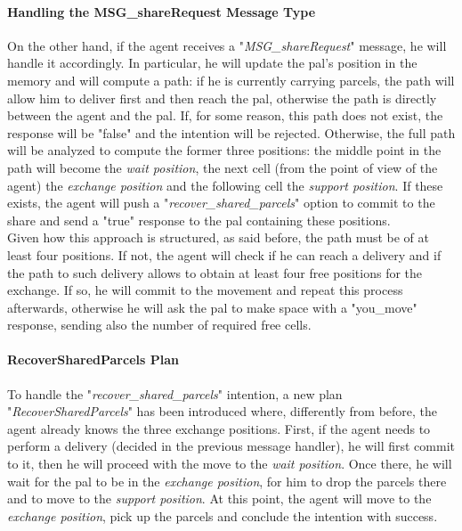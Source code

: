                 \paragraph{Handling the MSG\_shareRequest Message Type}
                    On the other hand, if the agent receives a "\textit{MSG\_shareRequest}" message, he will handle it accordingly. In particular, he will update the pal's position in the memory and will compute a path: if he is currently carrying parcels, the path will allow him to deliver first and then reach the pal, otherwise the path is directly between the agent and the pal. If, for some reason, this path does not exist, the response will be "false" and the intention will be rejected. Otherwise, the full path will be analyzed to compute the former three positions: the middle point in the path will become the \textit{wait position}, the next cell (from the point of view of the agent) the \textit{exchange position} and the following cell the \textit{support position}. If these exists, the agent will push a "\textit{recover\_shared\_parcels}" option to commit to the share and send a "true" response to the pal containing these positions.
                    \medskip\\
                    Given how this approach is structured, as said before, the path must be of at least four positions. If not, the agent will check if he can reach a delivery and if the path to such delivery allows to obtain at least four free positions for the exchange. If so, he will commit to the movement and repeat this process afterwards, otherwise he will ask the pal to make space with a "you\_move" response, sending also the number of required free cells.

                \paragraph{RecoverSharedParcels Plan}
                    To handle the "\textit{recover\_shared\_parcels}" intention, a new plan "\textit{RecoverSharedParcels}" has been introduced where, differently from before, the agent already knows the three exchange positions. First, if the agent needs to perform a delivery (decided in the previous message handler), he will first commit to it, then he will proceed with the move to the \textit{wait position}. Once there, he will wait for the pal to be in the \textit{exchange position}, for him to drop the parcels there and to move to the \textit{support position}. At this point, the agent will move to the \textit{exchange position}, pick up the parcels and conclude the intention with success.        
